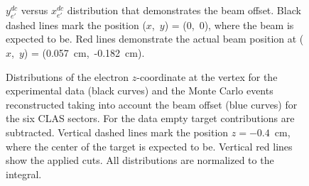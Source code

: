 \begin{figure}[!ht]
\begin{center}
\end{center}
\caption{\small $y_{e'}^{dc}$ versus $x_{e'}^{dc}$ distribution that demonstrates the beam offset. Black dashed lines mark the position ($x$,~$y$) = (0,~0), where the beam is expected to be. Red lines demonstrate the actual beam position at ($x$,~$y$) = (0.057~cm,~-0.182~cm). }
\label{fig:beam_offset}
\end{figure}



\begin{figure}[!ht]
\begin{center}
\end{center}
\caption{\small Distributions of the electron $z$-coordinate at the vertex for the experimental data (black curves) and the Monte Carlo events reconstructed taking into account the beam offset (blue curves) for the six CLAS sectors. For the data empty target contributions are subtracted. Vertical dashed lines mark the position $z = -0.4$~cm, where the center of the target is expected to be. Vertical red lines show the applied cuts. All distributions are normalized to the integral. }
\label{fig:z_el_data_sim}
\end{figure}

